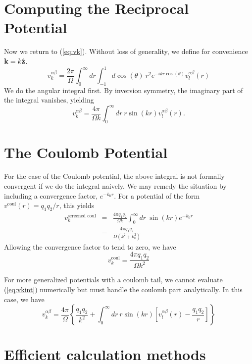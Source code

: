 \documentclass{article}
\begin{document}
\section {Computing the Reciprocal Potential}
Now we return to (\ref{eq:vk}).  Without loss of generality, we define
for convenience $\mathbf{k} = k\hat{\mathbf{z}}$.
\begin{equation}
v^{\alpha \beta}_k = \frac{2\pi}{\Omega} \int_0^\infty dr \int_{-1}^1
  d\cos(\theta) \ r^2 e^{-i k r \cos(\theta)} v_l^{\alpha \beta}(r)
\end{equation}
We do the angular integral first.  By inversion symmetry, the
imaginary part of the integral vanishes, yielding
\begin{equation}
v^{\alpha \beta}_k = \frac{4\pi}{\Omega k}\int _0^\infty dr\ r \sin(kr)
v^{\alpha \beta}_l(r).
\label{eq:vkint}
\end{equation}

\section{The Coulomb Potential}
For the case of the Coulomb potential, the above integral is not
formally convergent if we do the integral naively. We may remedy the
situation by including a convergence factor, $e^{-k_0 r}$.  For a
potential of the form $v^\text{coul}(r) = q_1 q_2/r$, this yields
\begin{eqnarray}
v^{\text{screened coul}}_k & = & \frac{4\pi q_1 q_2}{\Omega k} \int_0^\infty dr\ \sin(kr)
e^{-k_0r} \\ 
& = & \frac{4\pi q_1 q_2}{\Omega (k^2 + k_0^2)}
\end{eqnarray}
Allowing the convergence factor to tend to zero, we have
\begin{equation}
v_k^\text{coul} = \frac{4 \pi q_1 q_2}{\Omega k^2}
\end{equation}

For more generalized potentials with a coulomb tail, we cannot
evaluate (\ref{eq:vkint}) numerically but must handle the coulomb part
analytically.  In this case, we have
\begin{equation}
v_k^{\alpha \beta} = \frac{4\pi}{\Omega} 
\left\{ \frac{q_1 q_2}{k^2} + \int_0^\infty dr \ r \sin(kr) \left[ v_l^{\alpha \beta}(r) -
  \frac{q_1 q_2}{r} \right] \right\}
\end{equation}

\section{Efficient calculation methods}
\end{document}
